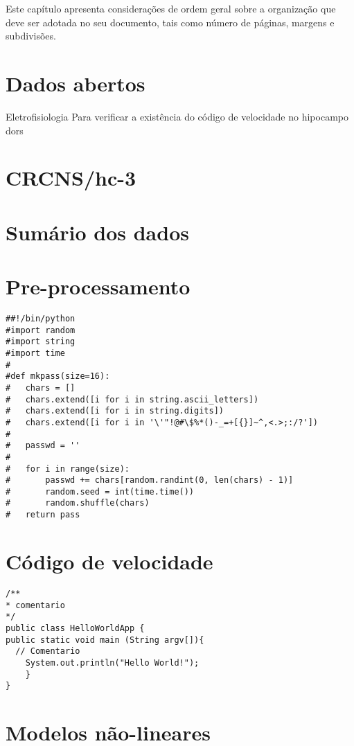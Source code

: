 
\label{Cap:methods}

Este capítulo apresenta considerações de ordem geral sobre a
organização que deve ser adotada no seu documento, tais como número de
páginas, margens e subdivisões.

\section{Dados abertos}
\label{Sec:opendata}

Eletrofisiologia Para verificar a existência do código de velocidade no hipocampo dors

\section{CRCNS/hc-3}
\label{Sec:crcns_hc3}

\section{Sumário dos dados}
\label{Sec:datasummary}

\section{Pre-processamento}
\label{Sec:preprocess}


\begin{lstlisting}
##!/bin/python
#import random
#import string
#import time
#
#def mkpass(size=16):
#	chars = []
#	chars.extend([i for i in string.ascii_letters])
#	chars.extend([i for i in string.digits])
#	chars.extend([i for i in '\'"!@#\$%*()-_=+[{}]~^,<.>;:/?'])
#
#	passwd = ''
#
#	for i in range(size):
#		passwd += chars[random.randint(0, len(chars) - 1)]
#		random.seed = int(time.time())
#		random.shuffle(chars)
#	return pass
\end{lstlisting}



\section{Código de velocidade}
\label{Sec:speedscore}
\begin{verbatim}
/**
* comentario
*/
public class HelloWorldApp {
public static void main (String argv[]){
  // Comentario
    System.out.println("Hello World!");
	}
}
\end{verbatim}

\section{Modelos não-lineares}
\label{Sec:speedscore}

